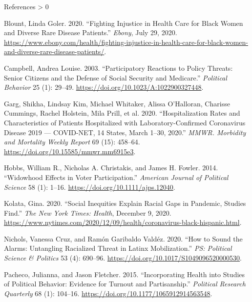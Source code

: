 \documentclass[
  ignorenonframetext,
  aspectratio=169]{beamer}
\newlength{\cslhangindent}
\newenvironment{CSLReferences}[2] %
 {%
  \setlength{\parindent}{0pt}
  \ifodd #1 \everypar{\setlength{\hangindent}{\cslhangindent}}\ignorespaces\fi
  \ifnum #2 > 0
  \setlength{\parskip}{#2\baselineskip}
  \fi
 }%
 {}
\begin{document}
\begin{frame}[allowframebreaks]{References}
\protect\hypertarget{references}{}
\hypertarget{refs}{}
\begin{CSLReferences}{1}{0}
\leavevmode\hypertarget{ref-Blount2020}{}%
Blount, Linda Goler. 2020. {``Fighting {Injustice} in {Health Care} for
{Black Women} and {Diverse Rare Disease Patients}.''} \emph{Ebony}, July
29, 2020.
\url{https://www.ebony.com/health/fighting-injustice-in-health-care-for-black-women-and-diverse-rare-disease-patients/}.

\leavevmode\hypertarget{ref-Campbell2003a}{}%
Campbell, Andrea Louise. 2003. {``Participatory {Reactions} to {Policy
Threats}: Senior {Citizens} and the {Defense} of {Social Security} and
{Medicare}.''} \emph{Political Behavior} 25 (1): 29--49.
\url{https://doi.org/10.1023/A:1022900327448}.

\leavevmode\hypertarget{ref-Garg2020}{}%
Garg, Shikha, Lindsay Kim, Michael Whitaker, Alissa O'Halloran, Charisse
Cummings, Rachel Holstein, Mila Prill, et al. 2020. {``Hospitalization
{Rates} and {Characteristics} of {Patients Hospitalized} with
{Laboratory}-{Confirmed Coronavirus Disease} 2019 --- {COVID}-{NET}, 14
{States}, {March} 1--30, 2020.''} \emph{MMWR. Morbidity and Mortality
Weekly Report} 69 (15): 458--64.
\url{https://doi.org/10.15585/mmwr.mm6915e3}.

\leavevmode\hypertarget{ref-Hobbs2014}{}%
Hobbs, William R., Nicholas A. Christakis, and James H. Fowler. 2014.
{``Widowhood {Effects} in {Voter Participation}.''} \emph{American
Journal of Political Science} 58 (1): 1--16.
\url{https://doi.org/10.1111/ajps.12040}.

\leavevmode\hypertarget{ref-Kolata2020}{}%
Kolata, Gina. 2020. {``Social {Inequities Explain Racial Gaps} in
{Pandemic}, {Studies Find}.''} \emph{The New York Times: Health},
December 9, 2020.
\url{https://www.nytimes.com/2020/12/09/health/coronavirus-black-hispanic.html}.

\leavevmode\hypertarget{ref-Nichols2020a}{}%
Nichols, Vanessa Cruz, and Ramón Garibaldo Valdéz. 2020. {``How to
{Sound} the {Alarms}: Untangling {Racialized Threat} in {Latinx
Mobilization}.''} \emph{PS: Political Science \& Politics} 53 (4):
690--96. \url{https://doi.org/10.1017/S1049096520000530}.

\leavevmode\hypertarget{ref-Pacheco2015}{}%
Pacheco, Julianna, and Jason Fletcher. 2015. {``Incorporating {Health}
into {Studies} of {Political Behavior}: Evidence for {Turnout} and
{Partisanship}.''} \emph{Political Research Quarterly} 68 (1): 104--16.
\url{https://doi.org/10.1177/1065912914563548}.


\end{CSLReferences}
\end{frame}
\end{document}
